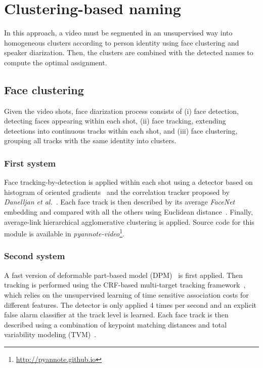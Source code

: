 \section{Clustering-based naming}
\label{sec:clustering}

In this approach, a video must be segmented in an unsupervised way into homogeneous clusters according to person identity using face clustering and speaker diarization. Then, the clusters are combined with the detected names to compute the optimal assignment.

\subsection{Face clustering}

Given the video shots, face diarization process consists of (i) face detection, detecting faces appearing within each shot, (ii) face tracking, extending detections into continuous tracks within each shot, and (iii) face clustering, grouping all tracks with the same identity into clusters.

\subsubsection{First system}

Face tracking-by-detection is applied within each shot using a detector based on histogram of oriented gradients~\cite{Dalal2005} and the correlation tracker proposed by \emph{Danelljan et al.}~\cite{Danelljan2014}. 
%
Each face track is then described by its average \emph{FaceNet} embedding and compared with all the others using Euclidean distance~\cite{Schroff2015}. 
%
Finally, average-link hierarchical agglomerative clustering is applied. Source code for this module is available in \emph{pyannote-video}\footnote{\url{http://pyannote.github.io}}.

\subsubsection{Second system}

A fast version of deformable part-based model (DPM)~\cite{felzenszwalb2010dpm,dubout2013deformable} is first applied. Then tracking is performed using the CRF-based multi-target tracking framework~\cite{heili2014tracking}, which relies on the unsupervised learning of time sensitive association costs for different features.
%
The detector is only applied 4 times per second and an explicit false alarm classifier at the track level is learned\cite{Le_ICPR_2016}.
%
Each face track is then described using a combination of keypoint matching distances and total variability modeling (TVM)~\cite{wallace2012total,Khoury:ICMR:2013}.

